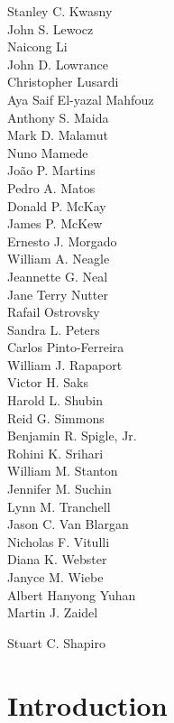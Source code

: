 \documentclass{book}
\begin{document}
\begin{multicols}{3}
Stanley C. Kwasny\\
John S. Lewocz\\
Naicong Li\\
John D. Lowrance\\
Christopher Lusardi\\
Aya Saif El-yazal Mahfouz\\
Anthony S. Maida\\
Mark D. Malamut\\
Nuno Mamede\\
Jo\~{a}o P. Martins\\
Pedro A. Matos\\
Donald P. McKay\\
James P. McKew\\
Ernesto J. Morgado\\
William A. Neagle\\
Jeannette G. Neal\\
Jane Terry Nutter\\
Rafail Ostrovsky\\
Sandra L. Peters\\
Carlos Pinto-Ferreira\\
William J. Rapaport\\
Victor H. Saks\\
Harold L. Shubin\\
Reid G. Simmons\\
Benjamin R. Spigle, Jr.\\
Rohini K. Srihari\\
William M. Stanton\\
Jennifer M. Suchin\\
Lynn M. Tranchell\\
Jason C. Van Blargan\\
Nicholas F. Vitulli\\
Diana K. Webster\\
Janyce M. Wiebe\\
Albert Hanyong Yuhan\\
Martin J. Zaidel
\end{multicols}

\begin{flushright}
Stuart C. Shapiro
\end{flushright}

\tableofcontents

\cleardoublepage
{}
\listoffigures

\mainmatter
\chapter{Introduction}
\end{document}
